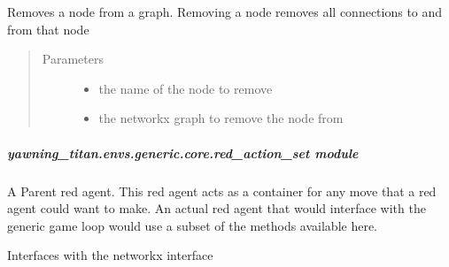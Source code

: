 \documentclass[letterpaper,10pt,english]{sphinxmanual}
\begin{document}
\begin{fulllineitems}
\label{\detokenize{source/yawning_titan.envs.generic.core:yawning_titan.envs.generic.core.network_interface.remove_node}}
\sphinxAtStartPar
Removes a node from a graph. Removing a node removes all connections to and from that node
\begin{quote}\begin{description}
\item[{Parameters}] \leavevmode\begin{itemize}
\item {}
\sphinxAtStartPar
{} \textendash{} the name of the node to remove

\item {}
\sphinxAtStartPar
{} \textendash{} the networkx graph to remove the node from

\end{itemize}

\end{description}\end{quote}

\end{fulllineitems}



\subparagraph{yawning\_titan.envs.generic.core.red\_action\_set module}
\label{\detokenize{source/yawning_titan.envs.generic.core:module-yawning_titan.envs.generic.core.red_action_set}}\label{\detokenize{source/yawning_titan.envs.generic.core:yawning-titan-envs-generic-core-red-action-set-module}}
\sphinxAtStartPar
A Parent red agent. This red agent acts as a container for any move that a red agent could want to make. An actual red
agent that would interface with the generic game loop would use a subset of the methods available here.

\sphinxAtStartPar
Interfaces with the networkx interface
\end{document}
